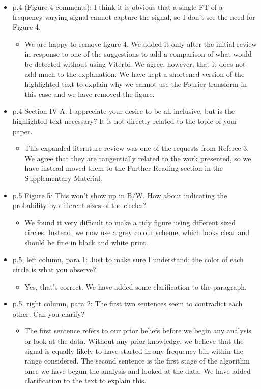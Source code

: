 \documentclass[a4paper, 10pt]{letter}
\begin{document}
\begin{itemize}
\item p.4 (Figure 4 comments):  I think it is obvious that a single FT of a frequency-varying signal cannot capture the signal, so I don't see the need for Figure 4. 
\begin{itemize}
\item We are happy to remove figure 4. We added it only after the initial review in response to one of the suggestions to add a comparison of what would be detected without using Viterbi. We agree, however, that it does not add much to the explanation. We have kept a shortened version of the highlighted text to explain why we cannot use the Fourier transform in this case and we have removed the figure. 
\end{itemize}

\item p.4 Section IV A: I appreciate your desire to be all-inclusive, but is the highlighted text necessary? It is not directly related to the topic of your paper. 
\begin{itemize}
\item This expanded literature review was one of the requests from Referee 3. We agree that they are tangentially related to the work presented, so we have instead moved them to the Further Reading section in the Supplementary Material. 
\end{itemize}

\item p.5 Figure 5: This won't show up in B/W. How about indicating the probability by different sizes of the circles? 
\begin{itemize}
\item We found it very difficult to make a tidy figure using different sized circles. Instead, we now use a grey colour scheme, which looks clear and should be fine in black and white print. 
\end{itemize}

\item p.5, left column, para 1: Just to make sure I understand: the color of each circle is what you observe?
\begin{itemize}
\item Yes, that's correct. We have added some clarification to the paragraph.
\end{itemize}

\item p.5, right column, para 2: The first two sentences seem to contradict each other. Can you clarify? 
\begin{itemize}
\item The first sentence refers to our prior beliefs before we begin any analysis or look at the data. Without any prior knowledge, we believe that the signal is equally likely to have started in any frequency bin within the range considered. The second sentence is the first stage of the algorithm once we have begun the analysis and looked at the data. We have added clarification to the text to explain this. 
\end{itemize}


\end{itemize}
\end{document}
